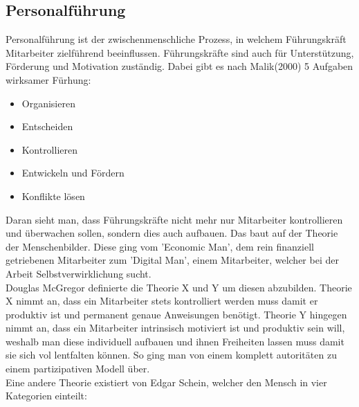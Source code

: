 \documentclass{article}
\begin{document}
	 \subsection{Personalführung}
	 Personalführung ist der zwischenmenschliche Prozess, in welchem Führungskräft Mitarbeiter zielführend beeinflussen. Führungskräfte sind auch für Unterstützung, Förderung und Motivation zuständig. Dabei gibt es nach Malik(2000) 5 Aufgaben wirksamer Fürhung:
	 \begin{itemize}
	 	\item{Organisieren}
	 	\item{Entscheiden}
	 	\item{Kontrollieren}
	 	\item{Entwickeln und Fördern}
	 	\item{Konflikte lösen}
	 \end{itemize}
	 Daran sieht man, dass Führungskräfte nicht mehr nur Mitarbeiter kontrollieren und überwachen sollen, sondern dies auch aufbauen. Das baut auf der Theorie der Menschenbilder. Diese ging vom 'Economic Man', dem rein finanziell getriebenen Mitarbeiter zum 'Digital Man', einem Mitarbeiter, welcher bei der Arbeit Selbstverwirklichung sucht. \\
	 Douglas McGregor definierte die Theorie X und Y um diesen abzubilden. Theorie X nimmt an, dass ein Mitarbeiter stets kontrolliert werden muss damit er produktiv ist und permanent genaue Anweisungen benötigt. Theorie Y hingegen nimmt an, dass ein Mitarbeiter intrinsisch motiviert ist und produktiv sein will, weshalb man diese individuell aufbauen und ihnen Freiheiten lassen muss damit sie sich vol lentfalten können. So ging man von einem komplett autoritäten zu einem partizipativen Modell über. \\
	 Eine andere Theorie existiert von Edgar Schein, welcher den Mensch in vier Kategorien einteilt:
\end{document}
